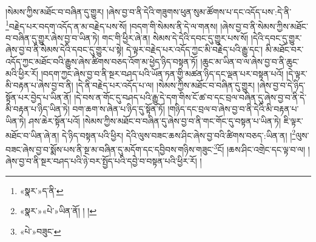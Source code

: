 །སེམས་ཀྱིས་མཐོང་བ་བཞིན་དུ་གྱུར། །ཞེས་བྱ་བ་ནི་དེའི་གཟུགས་ཕུན་སུམ་ཚོགས་པ་དང་འདོད་པས་:དེ་ནི་\footnote{«སྣར་»ད་ནི་}བརྗེད་པར་བདག་འདོད་ན་མ་བརྗེད་པས་སོ། །བདག་གི་སེམས་ནི་དེ་ལ་གནས། །ཞེས་བྱ་བ་ནི་སེམས་ཀྱིས་མཐོང་བ་བཞིན་དུ་གྱུར་ཞེས་བྱ་བ་ཡིན་ཏེ། གང་གི་ཕྱིར་ཞེ་ན། སེམས་དེ་དེའི་དབང་དུ་གྱུར་པས་སོ། །དེའི་དབང་དུ་གྱུར་ཞེས་བྱ་བ་ནི་སེམས་དེའི་དབང་དུ་གྱུར་པ་སྟེ། དེ་ལྟར་བརྗེད་པར་འདོད་ཀྱང་མི་བརྗེད་པའི་རྒྱུ་དང་། མི་མཐོང་བར་འདོད་ཀྱང་མཐོང་བའི་རྒྱུས་ཞེས་ཚིགས་བཅད་འོག་མ་ཕྱེད་ཉིད་བསྟན་ཏོ། །ཆུང་མ་ཡིན་བ་ལ་ཞེས་བྱ་བ་ནི་ཆུང་མའི་ཕྱིར་རོ། །བདག་ཀྱང་ཞེས་བྱ་བ་ནི་སྔར་བཤད་པའི་ཡོན་ཏན་གྱི་མཚན་ཉིད་དང་ལྡན་པར་བསྟན་པའོ། །དེ་ལྟར་མི་བརྟན་པ་ཞེས་བྱ་བ་ནི། །དེ་ནི་བརྗེད་པར་འདོད་པ་ལ། །སེམས་ཀྱིས་མཐོང་བ་བཞིན་དུ་གྱུར། །ཞེས་བྱ་བ་དེ་ཉིད་སྟོན་པར་བྱེད་པ་ཡིན་ནོ། །དེ་བས་ན་གོང་དུ་བཤད་པའི་རྒྱུ་དེ་དག་གིས་ངོ་ཚ་བ་དང་བྲལ་བཞིན་དུ་ཞེས་བྱ་བ་ནི་དེ་མི་བརྟན་པ་ཉིད་ཡིན་ཏེ། བག་ཆག་ས་ཞེན་པ་ཉིད་དུ་སྟོན་ཏོ། །གཉིད་དང་བྲལ་བ་ཞེས་བྱ་བ་ནི་དེའི་མི་བརྟན་པ་ཡིན་ཏེ། ཤས་ཆེར་སྟོན་པའོ། །སེམས་ཀྱིས་མཐོང་བ་བཞིན་དུ་ཞེས་བྱ་བ་ནི་གང་གོང་དུ་བསྟན་པ་ཡིན་ཏེ། ཇི་ལྟར་མཐོང་བ་ཡིན་ཞེ་ན། དེ་ཉིད་བསྟན་པའི་ཕྱིར། དེའི་ལུས་བཟང་ཆས་ཤིང་ཞེས་བྱ་བའི་ཚིགས་བཅད་:ཡིན་ན། །\footnote{«སྣར་»«པེ་»ཡིན་ནོ། ། །}ལུས་བཟང་ཞེས་བྱ་བ་སྨོས་པས་ནི་སྔ་མ་བཞིན་དུ་མདོག་དང་དབྱིབས་གཉིས་གཟུང་\footnote{«པེ་»བཟུང་}ངོ། །ཆས་ཤིང་འགྲེང་དང་ལྟ་བ་ལ། །ཞེས་བྱ་བ་ནི་སྔར་བཤད་པའི་ཉེ་བར་སྤྱོད་པའི་དབྱེ་བ་བསྟན་པའི་ཕྱིར་རོ། །
